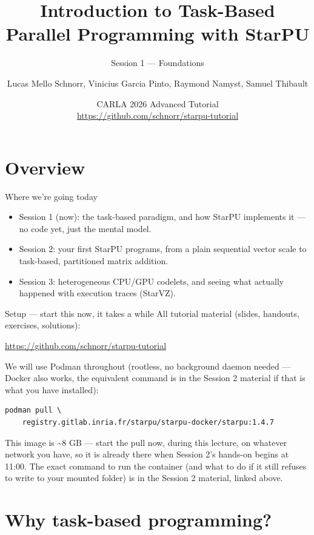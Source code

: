 \documentclass[presentation, aspectratio=169]{beamer}
\author{Lucas Mello Schnorr, Vinicius Garcia Pinto, Raymond Namyst, Samuel Thibault}
\date{CARLA 2026 Advanced Tutorial \\ {\small \url{https://github.com/schnorr/starpu-tutorial}}}
\title{Introduction to Task-Based Parallel Programming with StarPU}
\subtitle{Session 1 — Foundations}
\begin{document}
\maketitle
\section{Overview}
\label{sec:org60d640b}
\begin{frame}[label={sec:org10381ba}]{Where we're going today}
\begin{itemize}
\item \alert{Session 1 (now)}: the task-based paradigm, and how StarPU implements
it — no code yet, just the mental model.
\item \alert{Session 2}: your first StarPU programs, from a plain sequential
vector scale to task-based, partitioned matrix addition.
\item \alert{Session 3}: heterogeneous CPU/GPU codelets, and seeing what actually
happened with execution traces (StarVZ).
\end{itemize}
\end{frame}
\begin{frame}[label={sec:org5d446eb},fragile]{Setup — start this now, it takes a while}
 All tutorial material (slides, handouts, exercises, solutions):

\url{https://github.com/schnorr/starpu-tutorial}

We will use \alert{Podman} throughout (rootless, no background daemon needed
— Docker also works, the equivalent command is in the Session 2
material if that is what you have installed):

\begin{verbatim}
podman pull \
    registry.gitlab.inria.fr/starpu/starpu-docker/starpu:1.4.7
\end{verbatim}

This image is \alert{\textasciitilde{}8 GB} — start the pull \alert{now}, during this lecture, on
whatever network you have, so it is already there when Session 2's
hands-on begins at 11:00. The exact command to run the container (and
what to do if it still refuses to write to your mounted folder) is in
the Session 2 material, linked above.
\end{frame}
\section{Why task-based programming?}
\label{sec:org9e5498e}
\end{document}
